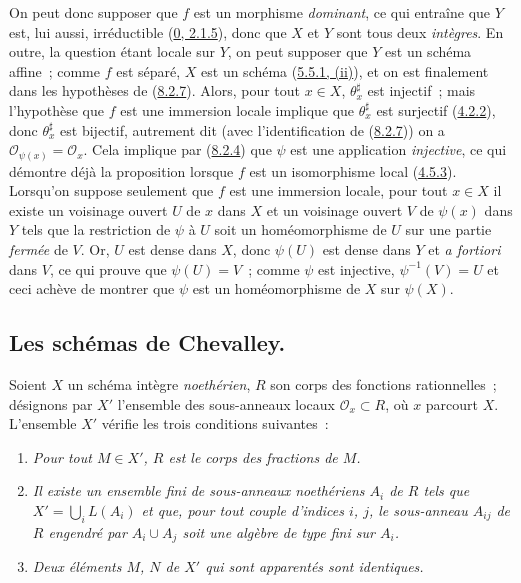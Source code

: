 On peut donc supposer que $f$ est un morphisme \emph{dominant}, ce qui
entraîne que $Y$ est, lui aussi, irréductible
(\hyperref[0.2.1.5-fr]{0, 2.1.5}), donc que $X$ et $Y$ sont tous deux
\emph{intègres}. En outre, la question étant locale sur $Y$, on peut supposer
que $Y$ est un schéma affine~; comme $f$ est séparé, $X$ est un schéma
(\hyperref[I.5.5.1-fr]{5.5.1, (ii)}), et on est finalement dans les
hypothèses de (\hyperref[I.8.2.7-fr]{8.2.7}). Alors, pour tout $x\in X$,
$\theta_x^\sharp$ est injectif~; mais l'hypothèse que $f$ est une immersion
locale implique que $\theta_x^\sharp$ est surjectif
(\hyperref[I.4.2.2-fr]{4.2.2}), donc $\theta_x^\sharp$ est bijectif,
autrement dit (avec l'identification de
(\hyperref[I.8.2.7-fr]{8.2.7})) on a
$\mathscr{O}_{\psi(x)}=\mathscr{O}_x$. Cela implique par
(\hyperref[I.8.2.4-fr]{8.2.4}) que $\psi$ est une application
\emph{injective}, ce qui démontre déjà la proposition lorsque $f$ est un
isomorphisme local (\hyperref[I.4.5.3-fr]{4.5.3}). Lorsqu'on suppose seulement
que $f$ est une immersion locale, pour tout $x\in X$ il existe un voisinage
ouvert $U$ de $x$ dans $X$ et un voisinage ouvert $V$ de $\psi(x)$ dans $Y$
tels que la restriction de $\psi$ à $U$ soit un homéomorphisme de $U$ sur une
partie \emph{fermée} de $V$. Or, $U$ est dense dans $X$, donc $\psi(U)$ est
dense dans $Y$ et \emph{a fortiori} dans $V$, ce qui prouve que
$\psi(U)=V$~; comme $\psi$ est injective, $\psi^{-1}(V)=U$ et ceci achève de
montrer que $\psi$ est un homéomorphisme de $X$ sur $\psi(X)$.

\subsection{Les schémas de Chevalley.}
\label{subsection:I.8.3-fr}

\begin{env}[8.3.1]
\label{I.8.3.1-fr}
Soient $X$ un schéma intègre \emph{noethérien}, $R$ son corps des fonctions
rationnelles~; désignons par $X'$ l'ensemble des sous-anneaux locaux
$\mathscr{O}_x\subset R$, où $x$ parcourt $X$. L'ensemble $X'$ vérifie les
trois conditions suivantes~:
\begin{enumerate}
  \item[(Sch. 1)] \emph{Pour tout $M\in X'$, $R$ est le corps des fractions
    de $M$.}
  \item[(Sch. 2)] \emph{Il existe un ensemble fini de sous-anneaux
    noethériens $A_i$ de $R$ tels que $X'=\bigcup_i L(A_i)$ et que, pour tout
    couple d'indices $i$, $j$, le sous-anneau $A_{ij}$ de $R$ engendré par
    $A_i\cup A_j$ soit une algèbre de type fini sur $A_i$.}
  \item[(Sch. 3)] \emph{Deux éléments $M$, $N$ de $X'$ qui sont apparentés
    sont identiques.}
\end{enumerate}
\end{env}


